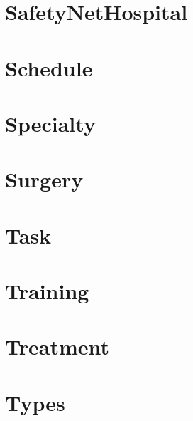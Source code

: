\documentclass{article}
\begin{document}
\section{SafetyNetHospital}

\section{Schedule}

\section{Specialty}

\section{Surgery}

\section{Task}

\section{Training}

\section{Treatment}

\section{Types}

\end{document}
